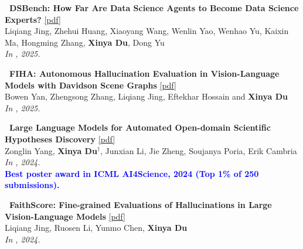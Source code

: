 \begin{enumerate}[{[}1{]},leftmargin=*]


\parbox{\textwidth}{
\item 
{\bf\ DSBench: How Far Are Data Science Agents to Become Data Science Experts?} 
\href{https://arxiv.org/pdf/2409.07703}{{{[pdf]}}} \\
     Liqiang Jing, Zhehui Huang, Xiaoyang Wang, Wenlin Yao, Wenhao Yu, Kaixin Ma, Hongming Zhang, \textbf{Xinya Du}, Dong Yu \\
{\it In \ICLR, 2025.} \\
}

\parbox{\textwidth}{
\item 
{\bf\ FIHA: Autonomous Hallucination Evaluation in Vision-Language Models with Davidson Scene Graphs} 
\href{https://arxiv.org/pdf/2409.13612}{{{[pdf]}}} \\
     Bowen Yan, Zhengsong Zhang, Liqiang Jing, Eftekhar Hossain and \textbf{Xinya Du}\\
{\it In \ACLfinding, 2025.} \\
}


\parbox{\textwidth}{
\item 
{\bf\ Large Language Models for Automated Open-domain Scientific Hypotheses Discovery} 
\href{https://aclanthology.org/2024.findings-acl.804.pdf}{{[pdf]}} \\
Zonglin Yang, \textbf{Xinya Du}$^{\dagger}$, Junxian Li, Jie Zheng, Soujanya Poria, Erik Cambria \\
{\it In \ACLfinding, 2024.} \\
% 
{\textcolor{blue}{\textbf{Best poster award in ICML AI4Science, 2024 (Top 1\% of 250 submissions).}}} \\
}


\item 
{\bf\ FaithScore: Fine-grained Evaluations of Hallucinations in Large Vision-Language Models} 
\href{https://arxiv.org/pdf/2311.01477}{{[pdf]}} \\
Liqiang Jing, Ruosen Li, Yunmo Chen, \textbf{Xinya Du}  \\
{\it In \EMNLPfinding, 2024.} \\



\end{enumerate}
